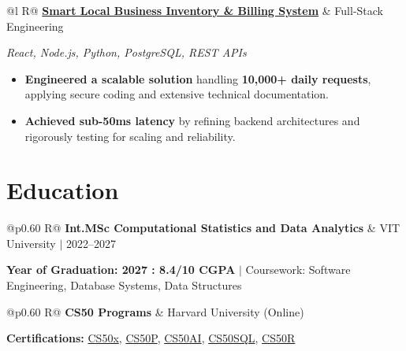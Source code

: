 \documentclass[a4paper,11pt]{article}
\newcommand{\subheading}[1]{\textbf{#1}}
\newcommand{\meta}[1]{{\fontsize{10}{12}\selectfont\textcolor[HTML]{3A3A3A}{#1}}}
\newcommand{\techstack}[1]{{\fontsize{10}{12}\selectfont\textcolor[HTML]{1A1A1A}{\textit{#1}}}}
\newcommand{\ulink}[2]{\href{#1}{#2}}
\begin{document}
\begin{tabularx}{\linewidth}{@{}l R@{}}
\subheading{\ulink{https://github.com/su-jin1425/Smart-Local-Business-Inventory-Billing-System}{Smart Local Business Inventory \& Billing System}} & \meta{Full-Stack Engineering}
\end{tabularx}
\techstack{React, Node.js, Python, PostgreSQL, REST APIs}
\begin{itemize}[nosep, leftmargin=1.5em, itemsep=2pt, topsep=2pt]
  \item {\color[HTML]{0A0A0A}\fontsize{11}{14}\selectfont \textbf{Engineered a scalable solution} handling \textbf{10,000+ daily requests}, applying secure coding and extensive technical documentation.}
  \item {\color[HTML]{0A0A0A}\fontsize{11}{14}\selectfont \textbf{Achieved sub-50ms latency} by refining backend architectures and rigorously testing for scaling and reliability.}
\end{itemize}

\section{Education}
\vspace{2pt}

\begin{tabularx}{\linewidth}{@{}p{0.60\linewidth} R@{}}
\subheading{Int.MSc Computational Statistics and Data Analytics} & \meta{VIT University $|$ 2022--2027}
\end{tabularx}
{\color[HTML]{3A3A3A}\fontsize{11}{14}\selectfont \textbf{Year of Graduation: 2027 : 8.4/10 CGPA} $|$ Coursework: Software Engineering, Database Systems, Data Structures}

\begin{tabularx}{\linewidth}{@{}p{0.60\linewidth} R@{}}
\subheading{CS50 Programs} & \meta{Harvard University (Online)}
\end{tabularx}
{\color[HTML]{3A3A3A}\fontsize{11}{14}\selectfont \textbf{Certifications:} \ulink{https://cs50.harvard.edu/certificates/b14b78df-e05c-413e-a607-1dd27303053a}{CS50x}, \ulink{https://cs50.harvard.edu/certificates/32477052-9db4-49c4-a5a4-d7e58429ca2c}{CS50P}, \ulink{https://cs50.harvard.edu/certificates/9cdb4d4a-1250-4f8e-9fd7-191864e0f919}{CS50AI}, \ulink{https://cs50.harvard.edu/certificates/bc486f24-f085-4e61-8536-80940b97a1b9}{CS50SQL}, \ulink{https://cs50.harvard.edu/certificates/666838e6-a053-4d82-b179-a60fe745fd84}{CS50R}}

\end{document}
